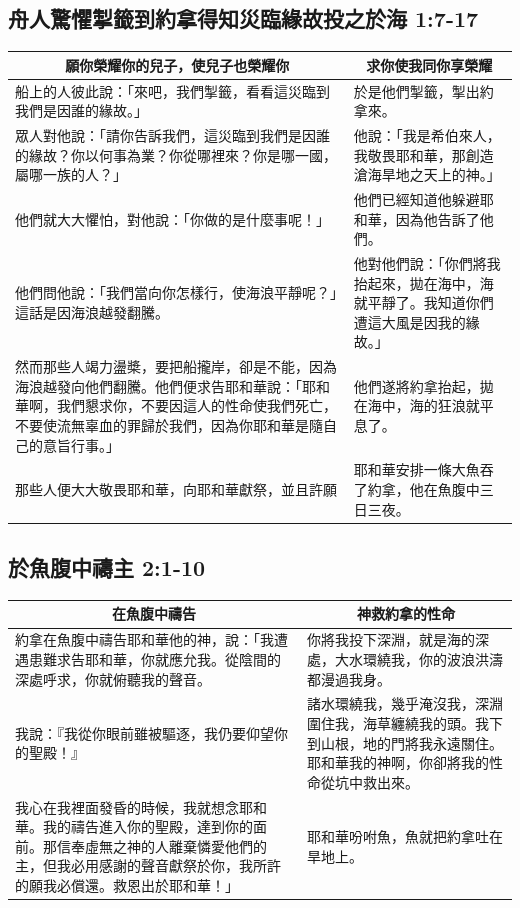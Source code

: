 \subsection{舟人驚懼掣籤到約拿得知災臨緣故投之於海 1:7-17}
 \begin{table}[H]
\centering
\begin{tabular}{p{}|p{8.50cm}}\hline\hline
\multicolumn{1}{c|}{願你榮耀你的兒子，使兒子也榮耀你}&\multicolumn{1}{c}{求你使我同你享榮耀}\\\hline
船上的人彼此說：「來吧，我們掣籤，看看這災臨到我們是因誰的緣故。」
&於是他們掣籤，掣出約拿來。\\\hline
眾人對他說：「請你告訴我們，這災臨到我們是因誰的緣故？你以何事為業？你從哪裡來？你是哪一國，屬哪一族的人？」&他說：「我是希伯來人，我敬畏耶和華，那創造滄海旱地之天上的神。」\\\hline
他們就大大懼怕，對他說：「你做的是什麼事呢！」&他們已經知道他躲避耶和華，因為他告訴了他們。\\\hline
他們問他說：「我們當向你怎樣行，使海浪平靜呢？」這話是因海浪越發翻騰。&他對他們說：「你們將我抬起來，拋在海中，海就平靜了。我知道你們遭這大風是因我的緣故。」\\\hline
然而那些人竭力盪槳，要把船攏岸，卻是不能，因為海浪越發向他們翻騰。他們便求告耶和華說：「耶和華啊，我們懇求你，不要因這人的性命使我們死亡，不要使流無辜血的罪歸於我們，因為你耶和華是隨自己的意旨行事。」&他們遂將約拿抬起，拋在海中，海的狂浪就平息了。\\\hline
那些人便大大敬畏耶和華，向耶和華獻祭，並且許願&耶和華安排一條大魚吞了約拿，他在魚腹中三日三夜。\\\hline
\end{tabular}
\end{table}

\subsection{於魚腹中禱主 2:1-10}
\begin{table}[H]
\centering
\begin{tabular}{p{9.5cm}|p{7.750cm}}\hline\hline
\multicolumn{1}{c|}{在魚腹中禱告}&\multicolumn{1}{c}{神救約拿的性命}\\\hline
約拿在魚腹中禱告耶和華他的神，說：「我遭遇患難求告耶和華，你就應允我。從陰間的深處呼求，你就俯聽我的聲音。 
&你將我投下深淵，就是海的深處，大水環繞我，你的波浪洪濤都漫過我身。\\\hline
我說：『我從你眼前雖被驅逐，我仍要仰望你的聖殿！』&諸水環繞我，幾乎淹沒我，深淵圍住我，海草纏繞我的頭。我下到山根，地的門將我永遠關住。耶和華我的神啊，你卻將我的性命從坑中救出來。 \\\hline
我心在我裡面發昏的時候，我就想念耶和華。我的禱告進入你的聖殿，達到你的面前。那信奉虛無之神的人離棄憐愛他們的主，但我必用感謝的聲音獻祭於你，我所許的願我必償還。救恩出於耶和華！」&耶和華吩咐魚，魚就把約拿吐在旱地上。\\\hline
\end{tabular}
\end{table}

